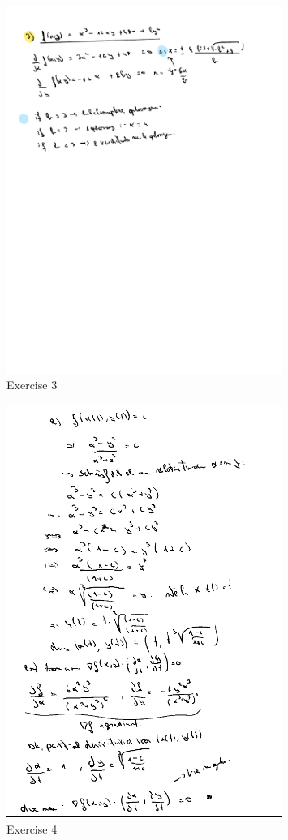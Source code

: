 \documentclass[a4paper]{report}
\begin{document}
\begin{figure}[H]
	\centering
	\includegraphics[width=0.8\textwidth]{assets/huis_4_ex_3.pdf}
	\caption{Exercise 3}
	\label{fig:huis_4_ex_3}
\end{figure}

\begin{figure}[H]
	\centering
	\includegraphics[width=0.8\textwidth]{assets/huis_4_ex_4.png}
	\caption{Exercise 4}
	\label{fig:huis_4_ex_4}
\end{figure}
\end{document}
